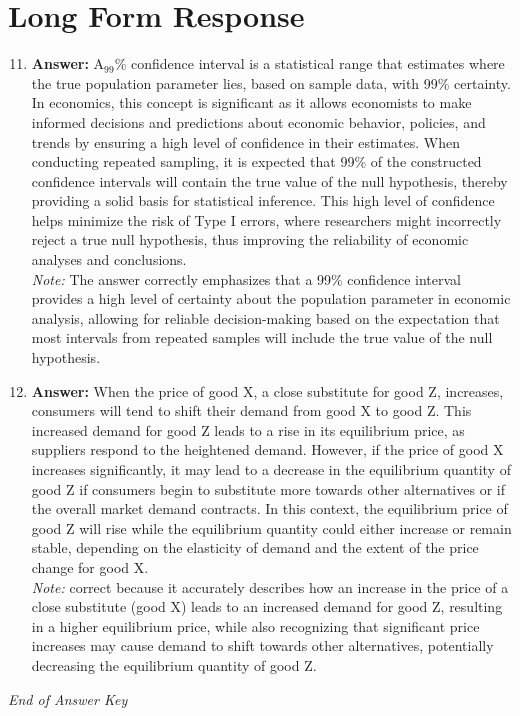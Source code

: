 \documentclass[12pt]{article}
\begin{document}
\section*{Long Form Response}
\begin{enumerate}[label=\arabic*.]
\setcounter{enumi}{10}
\item \textbf{Answer:} A$_{99}$\% confidence interval is a statistical range that estimates where the true population parameter lies, based on sample data, with 99\% certainty. In economics, this concept is significant as it allows economists to make informed decisions and predictions about economic behavior, policies, and trends by ensuring a high level of confidence in their estimates. When conducting repeated sampling, it is expected that 99\% of the constructed confidence intervals will contain the true value of the null hypothesis, thereby providing a solid basis for statistical inference. This high level of confidence helps minimize the risk of Type I errors, where researchers might incorrectly reject a true null hypothesis, thus improving the reliability of economic analyses and conclusions.
\\ \textit{Note:} The answer correctly emphasizes that a 99\% confidence interval provides a high level of certainty about the population parameter in economic analysis, allowing for reliable decision-making based on the expectation that most intervals from repeated samples will include the true value of the null hypothesis.
\item \textbf{Answer:} When the price of good X, a close substitute for good Z, increases, consumers will tend to shift their demand from good X to good Z. This increased demand for good Z leads to a rise in its equilibrium price, as suppliers respond to the heightened demand. However, if the price of good X increases significantly, it may lead to a decrease in the equilibrium quantity of good Z if consumers begin to substitute more towards other alternatives or if the overall market demand contracts. In this context, the equilibrium price of good Z will rise while the equilibrium quantity could either increase or remain stable, depending on the elasticity of demand and the extent of the price change for good X.
\\ \textit{Note:} correct because it accurately describes how an increase in the price of a close substitute (good X) leads to an increased demand for good Z, resulting in a higher equilibrium price, while also recognizing that significant price increases may cause demand to shift towards other alternatives, potentially decreasing the equilibrium quantity of good Z.
\end{enumerate}

\vfill
\noindent\textit{End of Answer Key}
\end{document}
